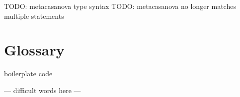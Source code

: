 \documentclass[10pt,a4paper]{article}
\begin{document}
\pagestyle{empty} 


\newpage

\setcounter{page}{1}
\pagestyle{plain}


\begin{multicols}{2}
\tableofcontents
\end{multicols}
\pagebreak

\begin{multicols}{2}




TODO: metacasanova type syntax
TODO: metacasanova no longer matches multiple statements








\setcounter{section}{0}
\renewcommand\thesection{\Alph{section}}
\section{Glossary}
boilerplate code

--- difficult words here ---

\end{multicols}

\printbibliography
\end{document}
